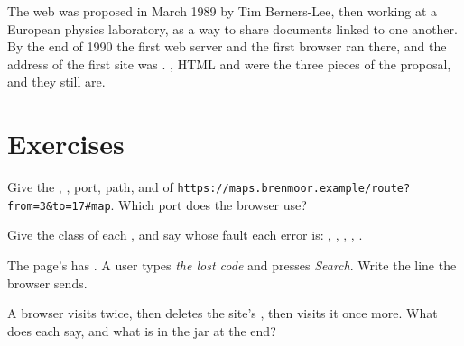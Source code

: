 \begin{history}
The web was proposed in March 1989 by Tim Berners-Lee, then working at a European physics laboratory, as a way to
share documents linked to one another. By the end of 1990 the first web server and the first browser ran there, and
the address of the first site was . , HTML and  were the three pieces of the proposal,
and they still are.
\end{history}

\section{Exercises}\label{sec:g10:http-clients-servers:exercises}

\begin{exercise}[$\star$]\label{exo:g10:http-clients-servers:1}
Give the , , port, path,  and  of
\texttt{https://maps.brenmoor.example/route?from=3\&to=17\#map}. Which port does the browser use?
\end{exercise}

\begin{exercise}[$\star$]\label{exo:g10:http-clients-servers:2}
Give the class of each , and say whose fault each error is: , , ,
, .
\end{exercise}

\begin{exercise}[$\star$]\label{exo:g10:http-clients-servers:3}
The page's  has . A user types \textit{the lost code} and presses \textit{Search}. Write the
 line the browser sends.
\end{exercise}

\begin{exercise}[$\star$]\label{exo:g10:http-clients-servers:4}
A browser visits  twice, then deletes the site's , then visits it once more. What does each
 say, and what is in the jar at the end?
\end{exercise}

